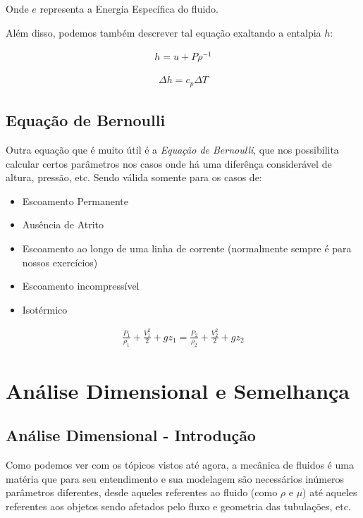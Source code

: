 \documentclass{article}
\begin{document}
Onde $e$ representa a Energia Específica do fluido.

Além disso, podemos também descrever tal equação exaltando a entalpia $h$:

\begin{minipage}{.5\textwidth}
    \begin{align*}
        h = u + P \rho^{-1}
    \end{align*}
\end{minipage}
\begin{minipage}{.5\textwidth}
    \begin{align*}
        \Delta h = c_p \Delta T
    \end{align*}
\end{minipage}

\subsection{Equação de Bernoulli}
Outra equação que é muito útil é a \emph{Equação de Bernoulli}, que nos possibilita calcular certos parâmetros nos casos onde há uma diferênça considerável de altura, pressão, etc. Sendo válida somente para os casos de:
\begin{itemize}
    \item Escoamento Permanente
    \item Ausência de Atrito
    \item Escoamento ao longo de uma linha de corrente (normalmente sempre é para nossos exercícios)
    \item Escoamento incompressível
    \item Isotérmico
\end{itemize}

\begin{align}
    \frac{P_1}{\rho_1} + \frac{V^2_1}{2} + gz_1 = \frac{P_2}{\rho_2} + \frac{V^2_2}{2} + gz_2
\end{align}

\newpage
\section{Análise Dimensional e Semelhança}
\subsection{Análise Dimensional - Introdução}


Como podemos ver com os tópicos vistos até agora, a mecânica de fluidos é uma matéria que para seu entendimento e sua modelagem são necessários inúmeros parâmetros diferentes, desde aqueles referentes
ao fluido (como $\rho$ e $\mu$) até aqueles referentes aos objetos sendo afetados pelo fluxo e geometria das tubulações, etc.
\end{document}
